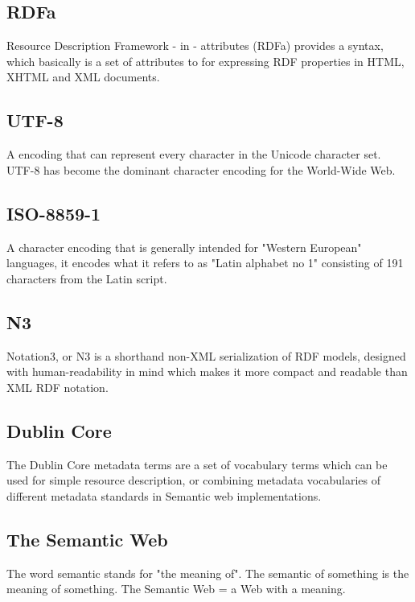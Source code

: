 \subsection*{RDFa} Resource Description Framework - in - attributes (RDFa) provides a syntax, which basically is a set of attributes to for expressing RDF properties in HTML, XHTML and XML documents.

\subsection*{UTF-8} A encoding that can represent every character in the
Unicode character set. UTF-8 has become the dominant character encoding for
the World-Wide Web.

\subsection*{ISO-8859-1} A character encoding that is generally intended for
"Western European" languages, it encodes what it refers to as "Latin alphabet
no 1" consisting of 191 characters from the Latin script.

\subsection*{N3}
Notation3, or N3 is a shorthand non-XML serialization of RDF models,
designed with human-readability in mind which makes it more compact and
readable than XML RDF notation.

\subsection*{Dublin Core}
The Dublin Core metadata terms are a set of vocabulary terms which
can be used for simple resource description, or combining metadata
vocabularies of different metadata standards in Semantic web implementations.

\subsection*{The Semantic Web}
The word semantic stands for "the meaning of". The semantic of something is the meaning of something. The Semantic Web = a Web with a meaning.
